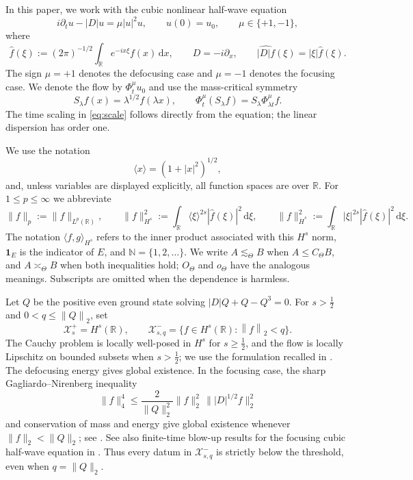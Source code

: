 \documentclass[11pt,reqno]{amsart}
\numberwithin{equation}{section}
\theoremstyle{remark}
\newcommand{\R}{\mathbb R}
\newcommand{\X}{\mathcal X}
\newcommand{\half}{\frac12}
\newcommand{\norm}[1]{\left\lVert #1\right\rVert}
\newcommand{\flow}[1]{\Phi^{#1}}
\begin{document}
In this paper, we work with the cubic nonlinear half-wave equation
\begin{equation}\label{eq:hw}
 i\partial_tu-|D|u=\mu|u|^2u,
 \qquad u(0)=u_0,
 \qquad \mu\in\{+1,-1\},
\end{equation}
where
\[
 \widehat f(\xi):=(2\pi)^{-1/2}\int_{\mathbb R}e^{-ix\xi}f(x)\,\mathrm dx,
 \qquad D=-i\partial_x,
 \qquad \widehat{|D|f}(\xi)=|\xi|\widehat f(\xi).
\]
The sign $\mu=+1$ denotes the defocusing case and $\mu=-1$ denotes the focusing case.  We denote the flow by
$\flow\mu_tu_0$ and use the mass-critical symmetry
\begin{equation}\label{eq:scale}
 S_\lambda f(x)=\lambda^{1/2}f(\lambda x),
 \qquad
 \flow\mu_t(S_\lambda f)=S_\lambda\flow\mu_{\lambda t}f.
\end{equation}
The time scaling in \eqref{eq:scale} follows directly from the equation; the
linear dispersion has order one.

We use the notation
\[
 \langle x\rangle=(1+|x|^2)^{1/2},
\]
and, unless variables are displayed explicitly, all function spaces are over
$\mathbb R$.  For $1\leq p\leq\infty$ we abbreviate
\begin{equation}\label{eq:norm-conventions}
 \|f\|_p:=\|f\|_{L^p(\mathbb R)},\qquad
 \|f\|_{H^s}^2:=\int_{\mathbb R}\langle\xi\rangle^{2s}|\widehat f(\xi)|^2
 \,\mathrm d\xi,\qquad
 \|f\|_{\dot H^s}^2:=\int_{\mathbb R}|\xi|^{2s}|\widehat f(\xi)|^2
 \,\mathrm d\xi.
\end{equation}
The notation $\langle f,g\rangle_{H^s}$ refers to the inner product associated
with this $H^s$ norm, $\mathbf 1_E$ is the indicator of $E$, and
$\mathbb N=\{1,2,\ldots\}$.  We write $A\lesssim_\Theta B$ when
$A\leq C_\Theta B$, and $A\asymp_\Theta B$ when both inequalities hold;
$O_\Theta$ and $o_\Theta$ have the analogous meanings.  Subscripts are omitted
when the dependence is harmless.

Let $Q$ be the positive even ground state solving
$|D|Q+Q-Q^3=0$.  For $s>\half$ and $0<q\leq\norm Q_2$, set
\begin{equation}\label{eq:spaces}
 \X^+_s=H^s(\R),
 \qquad
 \X^-_{s,q}=\{f\in H^s(\R):\norm f_2<q\}.
\end{equation}
The Cauchy problem is locally well-posed in $H^s$ for $s\geq\half$, and the
flow is locally Lipschitz on bounded subsets when $s>\half$; we use the
formulation recalled in \cite{ChoffrutPocovnicu}.  The defocusing energy gives
global existence.  In the focusing case, the sharp Gagliardo--Nirenberg
inequality
\[
 \|f\|_4^4\leq \frac{2}{\|Q\|_2^2}
 \|f\|_2^2\,\||D|^{1/2}f\|_2^2
\]
and conservation of mass and energy give global existence whenever
$\|f\|_2<\|Q\|_2$; see \cite{FrankLenzmann,KLR,GLPR}. See also finite-time blow-up results for the focusing cubic half-wave equation in \cite{KLR,CaoSuZhang,KimKwonParkBW,KimKwonParkLogLog,ParkNegativeEnergy}.  Thus every datum in
$\X^-_{s,q}$ is strictly below the threshold, even when
$q=\|Q\|_2$.
\end{document}
